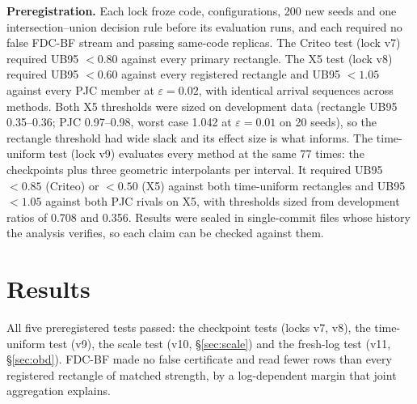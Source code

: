 \documentclass[sigconf,anonymous,review]{acmart}
\newcommand{\eps}{\varepsilon}
\begin{document}
\textbf{Preregistration.} Each lock froze code, configurations, 200 new seeds and one intersection--union decision rule before its evaluation runs, and each required no false FDC-BF stream and passing same-code replicas. The Criteo test (lock v7) required UB95 $< 0.80$ against every primary rectangle. The X5 test (lock v8) required UB95 $< 0.60$ against every registered rectangle and UB95 $< 1.05$ against every PJC member at $\eps = 0.02$, with identical arrival sequences across methods. Both X5 thresholds were sized on development data (rectangle UB95 0.35--0.36; PJC 0.97--0.98, worst case 1.042 at $\eps = 0.01$ on 20 seeds), so the rectangle threshold had wide slack and its effect size is what informs. The time-uniform test (lock v9) evaluates every method at the same 77 times: the checkpoints plus three geometric interpolants per interval. It required UB95 $< 0.85$ (Criteo) or $< 0.50$ (X5) against both time-uniform rectangles and UB95 $< 1.05$ against both PJC rivals on X5, with thresholds sized from development ratios of 0.708 and 0.356. Results were sealed in single-commit files whose history the analysis verifies, so each claim can be checked against them.

\section{Results}\label{sec:results}

All five preregistered tests passed: the checkpoint tests (locks v7, v8), the time-uniform test (v9), the scale test (v10, \S\ref{sec:scale}) and the fresh-log test (v11, \S\ref{sec:obd}). FDC-BF made no false certificate and read fewer rows than every registered rectangle of matched strength, by a log-dependent margin that joint aggregation explains.
\end{document}
